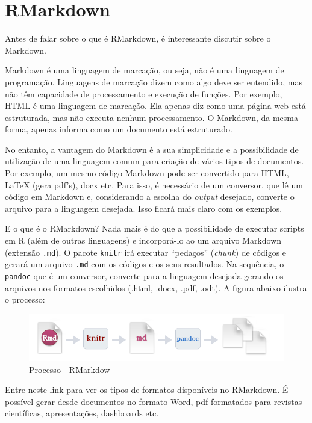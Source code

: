 \documentclass[]{book}
\begin{document}
\chapter{RMarkdown}\label{rmarkdown}

Antes de falar sobre o que é RMarkdown, é interessante discutir sobre o
Markdown.

Markdown é uma linguagem de marcação, ou seja, não é uma linguagem de
programação. Linguagens de marcação dizem como algo deve ser entendido,
mas não têm capacidade de processamento e execução de funções. Por
exemplo, HTML é uma linguagem de marcação. Ela apenas diz como uma
página web está estruturada, mas não executa nenhum processamento. O
Markdown, da mesma forma, apenas informa como um documento está
estruturado.

No entanto, a vantagem do Markdown é a sua simplicidade e a
possibilidade de utilização de uma linguagem comum para criação de
vários tipos de documentos. Por exemplo, um mesmo código Markdown pode
ser convertido para HTML, LaTeX (gera pdf's), docx etc. Para isso, é
necessário de um conversor, que lê um código em Markdown e, considerando
a escolha do \emph{output} desejado, converte o arquivo para a linguagem
desejada. Isso ficará mais claro com os exemplos.

E o que é o RMarkdown? Nada mais é do que a possibilidade de executar
scripts em R (além de outras linguagens) e incorporá-lo ao um arquivo
Markdown (extensão \texttt{.md}). O pacote \texttt{knitr} irá executar
``pedaços'' (\emph{chunk}) de códigos e gerará um arquivo \texttt{.md}
com os códigos e os seus resultados. Na sequência, o \texttt{pandoc} que
é um conversor, converte para a linguagem desejada gerando os arquivos
nos formatos escolhidos (.html, .docx, .pdf, .odt). A figura abaixo
ilustra o processo:

\begin{figure}
\centering
\includegraphics{images/rmarkdown.png}
\caption{Processo - RMarkdow}
\end{figure}

Entre \href{http://rmarkdown.rstudio.com/formats.html}{neste link} para
ver os tipos de formatos disponíveis no RMarkdown. É possível gerar
desde documentos no formato Word, pdf formatados para revistas
científicas, apresentações, dashboards etc.
\end{document}
